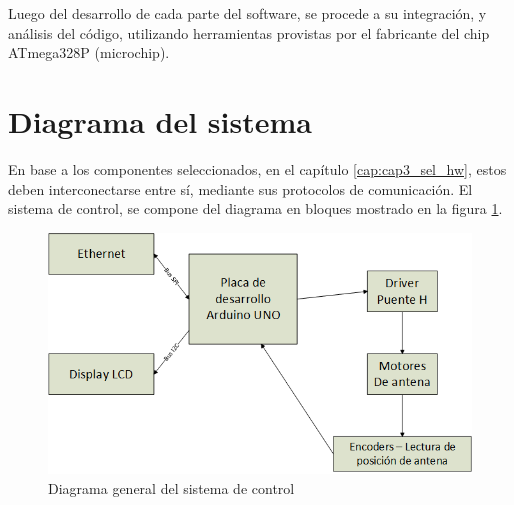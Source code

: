 
Luego del desarrollo de cada parte del software, se procede a su integración, y análisis del código, utilizando herramientas provistas por el fabricante del chip ATmega328P (microchip). 

\section{Diagrama del sistema} 

En base a los componentes seleccionados, en el capítulo \ref{cap:cap3_sel_hw}, estos deben interconectarse entre sí, mediante sus protocolos de comunicación. El sistema de control, se compone del diagrama en bloques mostrado en la figura \ref{fig:sistema_general}.  
\begin{figure}[ht]
	\hspace{-15mm}
	\includegraphics{sistema_general} 
	\caption{Diagrama general del sistema de control} 
	\label{fig:sistema_general}
\end{figure}

